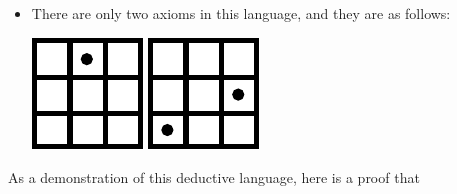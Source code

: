 \documentclass[12pt]{article}
\newcounter{rule}
\def\pA{\Phi}
\def\pB{\Psi}
\begin{document}
{\begin{itemize}
The second rule is that if two propositions $\pA$ and $\pB$ hold, then you can deduce a third proposition
which contains a dot in any square that has a dot in either $\pA$ or $\pB$, but not both.
So for example if you have the two propositions
and
,
then you can deduce from them that
.
\item There are only two axioms in this language, and they are as follows:
\begin{center}
\includegraphics[scale=\s]{img/gridgame/gridgame8.pdf}
\hspace{2em}
\includegraphics[scale=\s]{img/gridgame/gridgame9.pdf}
\end{center}
\end{itemize}
As a demonstration of this deductive language, here is a proof that 
}
\end{document}

